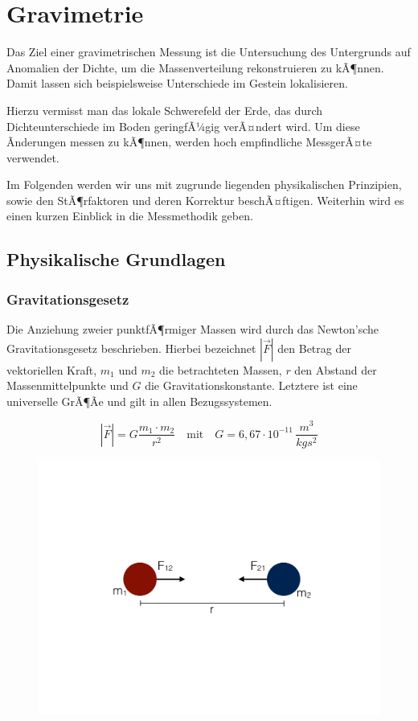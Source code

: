 \chapter{Gravimetrie}


Das Ziel einer gravimetrischen Messung ist die Untersuchung des Untergrunds auf Anomalien der Dichte, um die Massenverteilung rekonstruieren zu kÃ¶nnen. Damit lassen sich beispielsweise Unterschiede im Gestein lokalisieren. \par

 Hierzu vermisst man das lokale Schwerefeld der Erde, das durch Dichteunterschiede im Boden geringfÃ¼gig verÃ¤ndert wird. Um diese Ãnderungen messen zu kÃ¶nnen, werden hoch empfindliche MessgerÃ¤te verwendet.\par
 
 Im Folgenden werden wir uns mit zugrunde liegenden physikalischen Prinzipien, sowie den StÃ¶rfaktoren und deren Korrektur beschÃ¤ftigen. Weiterhin wird es einen kurzen Einblick in die Messmethodik geben.

\section{Physikalische Grundlagen}


\subsection*{Gravitationsgesetz}
Die Anziehung zweier punktfÃ¶rmiger Massen wird durch das Newton'sche Gravitationsgesetz beschrieben. Hierbei bezeichnet $|\vec{F}|$ den Betrag der vektoriellen Kraft, $m_1$ und $m_2$ die betrachteten Massen, $r$ den Abstand der Massenmittelpunkte und $G$ die Gravitationskonstante. Letztere ist eine universelle GrÃ¶Ãe und gilt in allen Bezugssystemen. 

\begin{equation*}
	|\vec{F}| = G \frac{m_1 \cdot m_2}{r^2} \quad \text{mit}\quad G = 6,67 \cdot 10^{-11}\,\frac{\si{m^3}}{\si{kg s^2}}
\end{equation*} 

\begin{figure}[H]
  \centering
  \includegraphics[width = \textwidth]{GravimetrieBilder/GravitationGrafik}
\end{figure}

